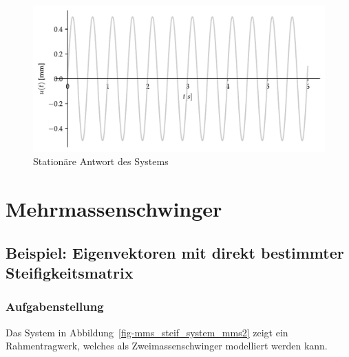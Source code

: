 \documentclass[
  letterpaper,
  DIV=11]{scrreprt}
\begin{document}
\begin{figure}[H]

{\centering \includegraphics{index_files/mediabag/ems_07_files/figure-pdf/fig-ems_untilg_stationaer_antwort-output-1.pdf}

}

\caption{\label{fig-ems_untilg_stationaer_antwort}Stationäre Antwort des
Systems}

\end{figure}

\part{Mehrmassenschwinger}

\hypertarget{beispiel-eigenvektoren-mit-direkt-bestimmter-steifigkeitsmatrix}{%
\chapter{Beispiel: Eigenvektoren mit direkt bestimmter
Steifigkeitsmatrix}\label{beispiel-eigenvektoren-mit-direkt-bestimmter-steifigkeitsmatrix}}

\hypertarget{aufgabenstellung-10}{%
\section{Aufgabenstellung}\label{aufgabenstellung-10}}

Das System in Abbildung~\ref{fig-mms_steif_system_mms2} zeigt ein
Rahmentragwerk, welches als Zweimassenschwinger modelliert werden kann.
\end{document}
